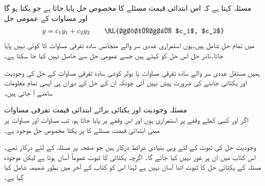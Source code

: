 مسئلہ  کہتا ہے کہ اس ابتدائی قیمت مسئلے کا مخصوص حل پایا جاتا ہے جو یکتا ہو گا اور مساوات  کے عمومی حل
\begin{align}
y=c_1y_1+c_2y_2\quad \quad \text{\RL{اختیاری $c_1$, $c_2$}}
\end{align}
میں تمام حل شامل ہیں۔یوں استمراری عددی سر والے متجانس سادہ تفرقی مساوات کا کوئی  نہیں پایا جاتا۔نادر حل اس حل کو کہتے ہیں جسے عمومی حل سے حاصل نہیں کیا جا سکتا ہے۔

ہمیں مستقل عددی سر والے سادہ تفرقی مساوات یا یولر کوشی سادہ تفرقی مساوات کے حل کی وجودیت اور یکتائی جاننے کی ضرورت پیش نہیں آئی چونکہ ان کے حل کے دوران ہی ایسی تمام معلومات سامنے آ جاتی ہیں۔

\quad مسئلہ وجودیت اور یکتائی برائے ابتدائی قیمت تفرقی مساوات\\
اگر  اور  کسی کھلے  وقفے  پر استمراری ہوں اور  اس وقفے پر پایا جاتا ہو، تب مساوات  اور مساوات  پر مبنی ابتدائی قیمت مسئلے کا  پر  یکتا مخصوص حل   موجود ہے۔  

وجودیت حل کی ثبوت کے لئے وہی بنیادی شرائط درکار ہیں جو صفحہ  پر مسئلہ  کے لئے درکار تھے۔اس کتاب میں ان پر غور نہیں کیا جائے گا۔ اگرچہ یکتائی کا ثبوت عموماً آسان ہوتا ہے لیکن موجودہ مسئلہ  کے یکتائی حل کا ثبوت اتنا آسان نہیں ہے لہٰذا اس کو کتاب کے آخر میں بطور ضمیمہ  شامل کیا گیا ہے۔ 

